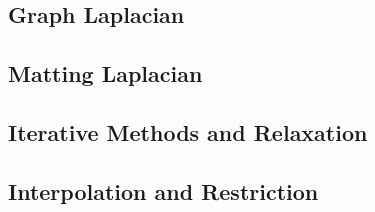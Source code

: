 \subsection{Graph Laplacian}

\subsection{Matting Laplacian}

\subsection{Iterative Methods and Relaxation}

\subsection{Interpolation and Restriction}
